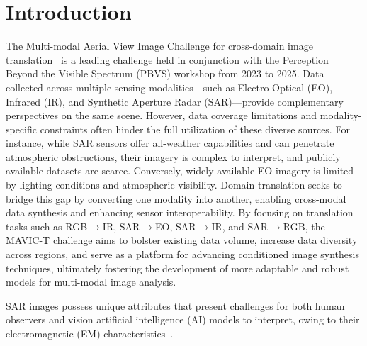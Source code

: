 \section{Introduction}
\label{sec:intro}



The Multi-modal Aerial View Image Challenge for cross-domain image translation~\cite{lowMultimodalAerialView2024,lowMultimodalAerialView2023,bowald3rdMultimodalAerial2025} is a leading challenge held in conjunction with the Perception Beyond the Visible Spectrum (PBVS) workshop from 2023 to 2025. Data collected across multiple sensing modalities---such as Electro-Optical (EO), Infrared (IR), and Synthetic Aperture Radar (SAR)---provide complementary perspectives on the same scene. However, data coverage limitations and modality-specific constraints often hinder the full utilization of these diverse sources. For instance, while SAR sensors offer all-weather capabilities and can penetrate atmospheric obstructions, their imagery is complex to interpret, and publicly available datasets are scarce. Conversely, widely available EO imagery is limited by lighting conditions and atmospheric visibility. Domain translation seeks to bridge this gap by converting one modality into another, enabling cross-modal data synthesis and enhancing sensor interoperability. By focusing on translation tasks such as RGB$\rightarrow$IR, SAR$\rightarrow$EO, SAR$\rightarrow$IR, and SAR$\rightarrow$RGB, the MAVIC-T challenge aims to bolster existing data volume, increase data diversity across regions, and serve as a platform for advancing conditioned image synthesis techniques, ultimately fostering the development of more adaptable and robust models for multi-modal image analysis.

SAR images possess unique attributes that present challenges for both human observers and vision artificial intelligence (AI) models to interpret, owing to their electromagnetic (EM) characteristics~\cite{majumder2020deep,huangClassificationLargeScaleHighResolution2021,huangDeepSARNetLearning2020,huangHDECTFAUnsupervisedLearning2021,huangPhysicallyExplainableCNN2022}.

